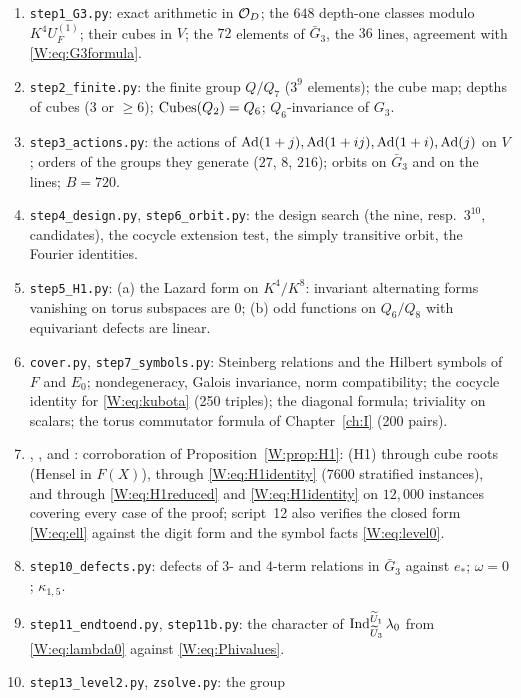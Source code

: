 \begin{enumerate}[label=\arabic*.]
\item \texttt{step1\_G3.py}: exact arithmetic in $\mathcal O_D$; the $648$
depth-one classes modulo $K^4U_F^{(1)}$; their cubes in $V$; the $72$
elements of $\bar G_3$, the $36$ lines, agreement with \eqref{W:eq:G3formula}.
\item \texttt{step2\_finite.py}: the finite group $Q/Q_7$ ($3^9$
elements); the cube map; depths of cubes ($3$ or $\ge6$);
$\mathrm{Cubes}(Q_2)=Q_6$; $Q_6$-invariance of $G_3$.
\item \texttt{step3\_actions.py}: the actions of $\operatorname{Ad}(1+j),\operatorname{Ad}(1+ij),\operatorname{Ad}(1+i),\operatorname{Ad}(j)$
on $V$; orders of the groups they generate ($27$, $8$, $216$); orbits on
$\bar G_3$ and on the lines; $B=720$.
\item \texttt{step4\_design.py}, \texttt{step6\_orbit.py}: the design
search (the nine, resp.\ $3^{10}$, candidates), the cocycle extension
test, the simply transitive orbit, the Fourier identities.
\item \texttt{step5\_H1.py}: (a) the Lazard form on $K^4/K^8$:
invariant alternating forms vanishing on torus subspaces are $0$;
(b) odd functions on $Q_6/Q_8$ with equivariant defects are linear.
\item \texttt{cover.py}, \texttt{step7\_symbols.py}: Steinberg
relations and the Hilbert symbols of $F$ and $E_0$; nondegeneracy,
Galois invariance, norm compatibility; the cocycle identity for
\eqref{W:eq:kubota} (250 triples); the diagonal formula; triviality on
scalars; the torus commutator formula of Chapter~\ref{ch:I} (200 pairs).
\item {}, , and
: corroboration of
Proposition~\ref{W:prop:H1}: (H1) through cube roots (Hensel in $F(X)$),
through \eqref{W:eq:H1identity} ($7600$ stratified instances), and
through \eqref{W:eq:H1reduced} and \eqref{W:eq:H1identity} on $12{,}000$
instances covering every case of the proof; script~12 also verifies the
closed form \eqref{W:eq:ell} against the digit form and the symbol facts
\eqref{W:eq:level0}.
\item \texttt{step10\_defects.py}: defects of $3$- and $4$-term
relations in $\bar G_3$ against $e_*$; $\omega=0$; $\kappa_{1,5}$.
\item \texttt{step11\_endtoend.py}, \texttt{step11b.py}: the character
of $\operatorname{Ind}_{\widetilde U_3}^{\widetilde U_1}\lambda_0$ from \eqref{W:eq:lambda0} against
\eqref{W:eq:Phivalues}.
\item \texttt{step13\_level2.py}, \texttt{zsolve.py}: the group

\end{enumerate}
